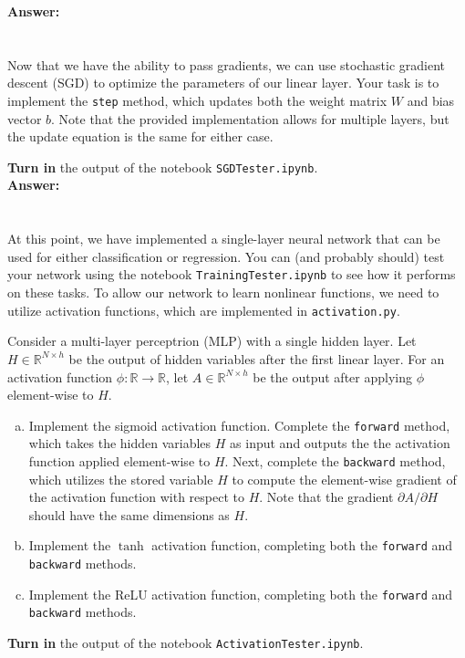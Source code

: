 \documentclass{article}[12pt]
\newcommand{\bR}{\mathbb{R}}
\begin{document}
\textbf{Answer:}\\



\clearpage
\section{}

Now that we have the ability to pass gradients, we can use stochastic gradient descent (SGD) to optimize the parameters of our linear layer. Your task is to implement the \texttt{step} method, which updates both the weight matrix $W$ and bias vector $b$. Note that the provided implementation allows for multiple layers, but the update equation is the same for either case.

\noindent \textbf{Turn in} the output of the notebook \texttt{SGDTester.ipynb}.\\

\textbf{Answer:}\\



\clearpage
\section{}

At this point, we have implemented a single-layer neural network that can be used for either classification or regression. You can (and probably should) test your network using the notebook \texttt{TrainingTester.ipynb} to see how it performs on these tasks. To allow our network to learn nonlinear functions, we need to utilize activation functions, which are implemented in \texttt{activation.py}.

Consider a multi-layer perceptrion (MLP) with a single hidden layer. Let $H \in \bR^{N \times h}$ be the output of hidden variables after the first linear layer. For an activation function $\phi: \bR \to \bR$, let $A \in \bR^{N \times h}$ be the output after applying $\phi$ element-wise to $H$.

\begin{enumerate}[(a)]
    \item Implement the sigmoid activation function. Complete the \texttt{forward} method, which takes the hidden variables $H$ as input and outputs the the activation function applied element-wise to $H$. Next, complete the \texttt{backward} method, which utilizes the stored variable $H$ to compute the element-wise gradient of the activation function with respect to $H$. Note that the gradient $\partial A / \partial H$ should have the same dimensions as $H$.
    \item Implement the $\tanh$ activation function, completing both the \texttt{forward} and \texttt{backward} methods.
    \item Implement the ReLU activation function, completing both the \texttt{forward} and \texttt{backward} methods.
\end{enumerate}
\textbf{Turn in} the output of the notebook \texttt{ActivationTester.ipynb}.\\
\end{document}
